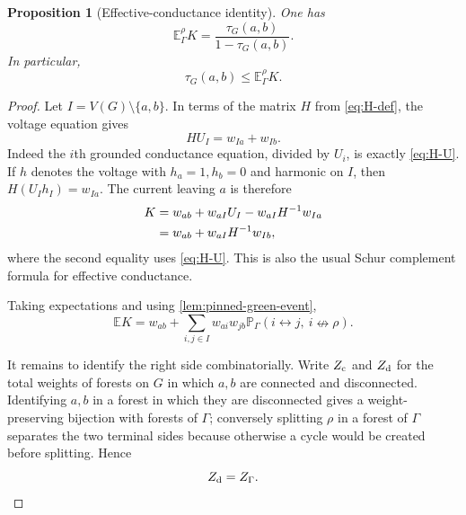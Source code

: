 \documentclass[11pt]{article}
\newtheorem{proposition}[theorem]{Proposition}
\theoremstyle{definition}
\theoremstyle{remark}
\newcommand{\PP}{\mathbb P}
\newcommand{\EE}{\mathbb E}
\newcommand{\1}{\mathbf 1}
\begin{document}
\begin{proposition}[Effective-conductance identity]\label{prop:conductance-identity}
One has
\begin{equation}\label{eq:conductance-odds}
 \EE_\Gamma^\rho K
 =\frac{\tau_G(a,b)}{1-\tau_G(a,b)}.
\end{equation}
In particular,
\begin{equation}\label{eq:tau-le-EK}
 \tau_G(a,b)\le \EE_\Gamma^\rho K.
\end{equation}
\end{proposition}

\begin{proof}
Let $I=V(G)\setminus\{a,b\}$.  In terms of the matrix $H$ from
\eqref{eq:H-def}, the voltage equation gives
\begin{equation}\label{eq:H-U}
 H U_I=w_{Ia}+w_{Ib}.
\end{equation}
Indeed the $i$th grounded conductance equation, divided by $U_i$, is exactly
\eqref{eq:H-U}.  If $h$ denotes the voltage with $h_a=1,h_b=0$ and harmonic on
$I$, then $H(U_I h_I)=w_{Ia}$.  The current leaving $a$ is therefore
\begin{align}
 K
 &=w_{ab}+w_{aI}U_I-w_{aI}H^{-1}w_{Ia}\notag\\
 &=w_{ab}+w_{aI}H^{-1}w_{Ib},
 \label{eq:K-Schur}
\end{align}
where the second equality uses \eqref{eq:H-U}.  This is also the usual Schur
complement formula for effective conductance.

Taking expectations and using \cref{lem:pinned-green-event},
\begin{equation}\label{eq:EK-event-sum}
 \EE K
 =w_{ab}+
 \sum_{i,j\in I}w_{ai}w_{jb}
 \PP_\Gamma(i\leftrightarrow j,\ i\nleftrightarrow\rho).
\end{equation}

It remains to identify the right side combinatorially.  Write $Z_{\rm c}$ and
$Z_{\rm d}$ for the total weights of forests on $G$ in which $a,b$ are connected and
disconnected.  Identifying $a,b$ in a forest in which they are disconnected gives a
weight-preserving bijection with forests of $\Gamma$; conversely splitting $\rho$ in
a forest of $\Gamma$ separates the two terminal sides because otherwise a cycle would
be created before splitting.  Hence
\begin{equation}\label{eq:Zd-ZGamma}
 Z_{\rm d}=Z_\Gamma.
\end{equation}


\end{proof}
\end{document}
